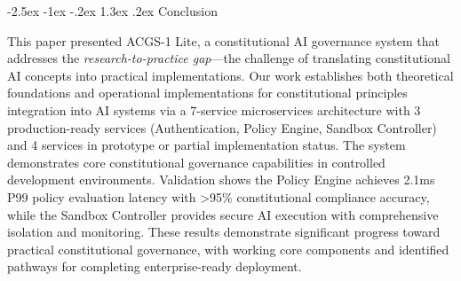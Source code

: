\documentclass[manuscript,screen,9pt]{acmart}
\makeatletter
\renewcommand\section{\@startsection{section}{1}{\z@}%
  {-2.5ex \@plus -1ex \@minus -.2ex}%
  {1.3ex \@plus.2ex}%
  {\normalfont\Large\bfseries}}
\makeatother
\begin{document}

\section{Conclusion}
\label{sec:conclusion}

This paper presented ACGS-1 Lite, a constitutional AI governance system that addresses the \textit{research-to-practice gap}—the challenge of translating constitutional AI concepts into practical implementations. Our work establishes both theoretical foundations and operational implementations for constitutional principles integration into AI systems via a 7-service microservices architecture with 3 production-ready services (Authentication, Policy Engine, Sandbox Controller) and 4 services in prototype or partial implementation status. The system demonstrates core constitutional governance capabilities in controlled development environments. Validation shows the Policy Engine achieves 2.1ms P99 policy evaluation latency with >95\% constitutional compliance accuracy, while the Sandbox Controller provides secure AI execution with comprehensive isolation and monitoring. These results demonstrate significant progress toward practical constitutional governance, with working core components and identified pathways for completing enterprise-ready deployment.
\end{document}
